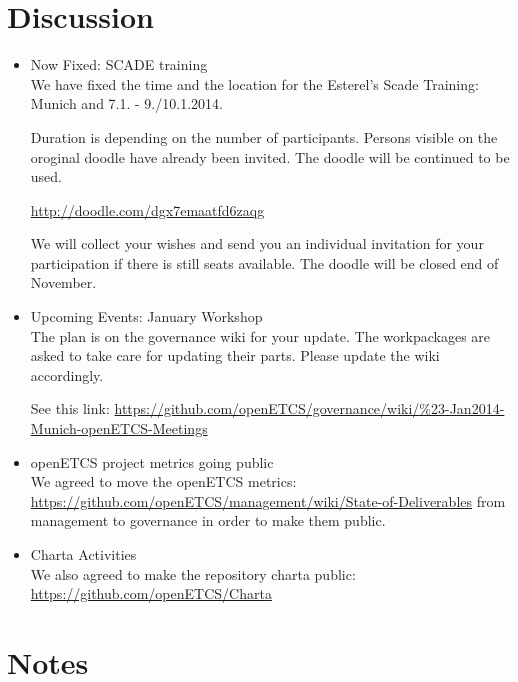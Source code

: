 \documentclass[a4paper, 11pt]{article}
\begin{document}
\section{Discussion}
\begin{itemize}

\item Now Fixed: SCADE training\\
We have fixed the time and the location for the Esterel's Scade Training: Munich and 7.1. - 9./10.1.2014. 

Duration is depending on the number of participants.
Persons visible on the oroginal doodle have already been invited. The doodle will be continued to be used.

\url{http://doodle.com/dgx7emaatfd6zaqg}

We will collect your wishes and send you an individual invitation for your participation if there is still seats  available. The doodle will be closed end of November.

\item Upcoming Events: January Workshop\\
The plan is on the governance wiki for your update. The workpackages are asked to take care for updating their parts. Please update the wiki accordingly.

See this link: \url{https://github.com/openETCS/governance/wiki/%23-Jan2014-Munich-openETCS-Meetings}

\item openETCS project metrics going public\\
We agreed to move the openETCS metrics: \url{https://github.com/openETCS/management/wiki/State-of-Deliverables} 
from management to governance in order to make them public.

\item Charta Activities\\
We also agreed to make the repository charta public:
\url{https://github.com/openETCS/Charta}

\end{itemize}

\section{Notes}
\end{document}
